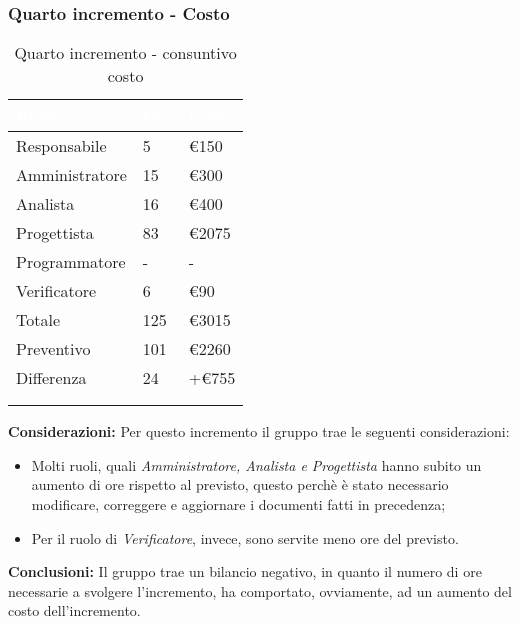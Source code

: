 {{\begin{longtable}{C{.3\freewidth} C{.1\freewidth} C{.1\freewidth} C{.1\freewidth} C{.1\freewidth} C{.1\freewidth} C{.1\freewidth} C{.1\freewidth} C{.1\freewidth} C{.3\freewidth}}
            \end{longtable} 
            

        }
        \subsubsection{Quarto incremento - Costo} {
            \setlength{\freewidth}{\dimexpr\textwidth-30\tabcolsep}
      \renewcommand{\arraystretch}{1.0}
      \centering
      \setlength{\aboverulesep}{0pt}
      \setlength{\belowrulesep}{0pt}
      \begin{longtable}{C{.4\freewidth} C{.2\freewidth} C{.2\freewidth}}
      \toprule
      \textcolor{white}{\textbf{Ruolo}}&
      \textcolor{white}{\textbf{Ore}}&
      \textcolor{white}{\textbf{Costo}}\\
      \toprule
      \endhead

      Responsabile & 5 & \euro150 \\
      Amministratore & 15 & \euro300 \\
      Analista & 16 & \euro400 \\
      Progettista & 83 & \euro2075 \\
      Programmatore & - & - \\
      Verificatore & 6 & \euro90 \\
      Totale & 125 & \euro3015 \\
      Preventivo & 101 & \euro2260 \\
      Differenza & 24 & +\euro755 \\
      \bottomrule
      \\
      \caption{Quarto incremento - consuntivo costo}
      \end{longtable} 
      \textbf{Considerazioni:} Per questo incremento il gruppo trae le seguenti considerazioni:
      \begin{itemize}
        \item Molti ruoli, quali \textit{Amministratore, Analista e Progettista} hanno subito un aumento di ore rispetto al previsto, questo perchè è stato necessario modificare, correggere e aggiornare i documenti fatti in precedenza;
        \item Per il ruolo di \textit{Verificatore}, invece, sono servite meno ore del previsto.
      \end{itemize} 
        \textbf{Conclusioni:} Il gruppo trae un bilancio negativo, in quanto il numero di ore necessarie a svolgere l'incremento, ha comportato, ovviamente, ad un aumento del costo dell'incremento. 
    }

}
